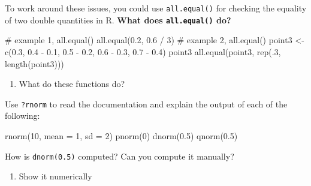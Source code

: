 \documentclass[
  letterpaper,
  DIV=11,
  numbers=noendperiod]{scrartcl}
\newenvironment{Shaded}{\begin{snugshade}}{\end{snugshade}}
\newcommand{\AttributeTok}[1]{\textcolor[rgb]{0.40,0.45,0.13}{#1}}
\newcommand{\CommentTok}[1]{\textcolor[rgb]{0.37,0.37,0.37}{#1}}
\newcommand{\DecValTok}[1]{\textcolor[rgb]{0.68,0.00,0.00}{#1}}
\newcommand{\FloatTok}[1]{\textcolor[rgb]{0.68,0.00,0.00}{#1}}
\newcommand{\FunctionTok}[1]{\textcolor[rgb]{0.28,0.35,0.67}{#1}}
\newcommand{\NormalTok}[1]{\textcolor[rgb]{0.00,0.23,0.31}{#1}}
\newcommand{\OtherTok}[1]{\textcolor[rgb]{0.00,0.23,0.31}{#1}}
\newcommand{\SpecialCharTok}[1]{\textcolor[rgb]{0.37,0.37,0.37}{#1}}
\providecommand{\tightlist}{%
  \setlength{\itemsep}{0pt}\setlength{\parskip}{0pt}}\usepackage{longtable,booktabs,array}
\begin{document}
To work around these issues, you could use \texttt{all.equal()} for
checking the equality of two double quantities in R. \textbf{What does
\texttt{all.equal()} do?}

\begin{Shaded}
\begin{Highlighting}[]
\CommentTok{\# example 1, all.equal()}
\FunctionTok{all.equal}\NormalTok{(}\FloatTok{0.2}\NormalTok{, }\FloatTok{0.6} \SpecialCharTok{/} \DecValTok{3}\NormalTok{)}
\CommentTok{\# example 2, all.equal()}
\NormalTok{point3 }\OtherTok{\textless{}{-}} \FunctionTok{c}\NormalTok{(}\FloatTok{0.3}\NormalTok{, }\FloatTok{0.4} \SpecialCharTok{{-}} \FloatTok{0.1}\NormalTok{, }\FloatTok{0.5} \SpecialCharTok{{-}} \FloatTok{0.2}\NormalTok{, }\FloatTok{0.6} \SpecialCharTok{{-}} \FloatTok{0.3}\NormalTok{, }\FloatTok{0.7} \SpecialCharTok{{-}} \FloatTok{0.4}\NormalTok{)}
\NormalTok{point3}
\FunctionTok{all.equal}\NormalTok{(point3, }\FunctionTok{rep}\NormalTok{(.}\DecValTok{3}\NormalTok{, }\FunctionTok{length}\NormalTok{(point3)))}
\end{Highlighting}
\end{Shaded}

\begin{enumerate}
\def\labelenumi{\arabic{enumi}.}
\setcounter{enumi}{1}
\tightlist
\item
  What do these functions do?
\end{enumerate}

Use \texttt{?rnorm} to read the documentation and explain the output of
each of the following:

\begin{Shaded}
\begin{Highlighting}[]
\FunctionTok{rnorm}\NormalTok{(}\DecValTok{10}\NormalTok{, }\AttributeTok{mean =} \DecValTok{1}\NormalTok{, }\AttributeTok{sd =} \DecValTok{2}\NormalTok{)}
\FunctionTok{pnorm}\NormalTok{(}\DecValTok{0}\NormalTok{)}
\FunctionTok{dnorm}\NormalTok{(}\FloatTok{0.5}\NormalTok{)}
\FunctionTok{qnorm}\NormalTok{(}\FloatTok{0.5}\NormalTok{)}
\end{Highlighting}
\end{Shaded}

How is \texttt{dnorm(0.5)} computed? Can you compute it manually?

\begin{enumerate}
\def\labelenumi{\arabic{enumi}.}
\setcounter{enumi}{2}
\tightlist
\item
  Show it numerically
\end{enumerate}
\end{document}
